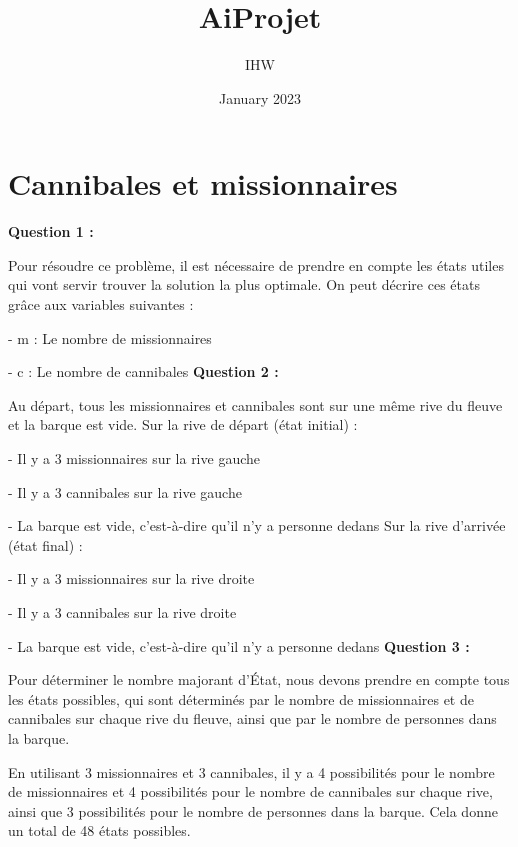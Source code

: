 \documentclass{article}
\title{AiProjet}
\author{IHW}
\date{January 2023}
\begin{document}
\maketitle

\section{Cannibales et missionnaires}

\textbf{Question  1 :}
\par Pour résoudre ce problème, il est nécessaire de prendre en compte les états utiles qui vont servir trouver la solution la plus optimale. On peut décrire ces états grâce aux variables suivantes : 
\par - m : Le nombre de missionnaires  
\par - c : Le nombre de cannibales
\newline\newline
\textbf{Question  2 :}
\par Au départ, tous les missionnaires et cannibales sont sur une même rive du fleuve et la barque est vide. 
\newline
Sur la rive de départ (état initial)  : 
\par - Il y a 3 missionnaires sur la rive gauche
\par - Il y a 3 cannibales sur la rive gauche
\par - La barque est vide, c'est-à-dire qu'il n'y a personne dedans\newline
Sur la rive d'arrivée (état final) : 
\par - Il y a 3 missionnaires sur la rive droite
\par - Il y a 3 cannibales sur la rive droite
\par - La barque est vide, c'est-à-dire qu'il n'y a personne dedans
\newline\newline
\textbf{Question  3 :}
\par Pour déterminer le nombre majorant d'État, nous devons prendre en compte tous les états possibles, qui sont déterminés par le nombre de missionnaires et de cannibales sur chaque rive du fleuve, ainsi que par le nombre de personnes dans la barque. 
\par En utilisant 3 missionnaires et 3 cannibales, il y a 4 possibilités pour le nombre de missionnaires et 4 possibilités pour le nombre de cannibales sur chaque rive, ainsi que 3 possibilités pour le nombre de personnes dans la barque. Cela donne un total de 48 états possibles. 
\end{document}
